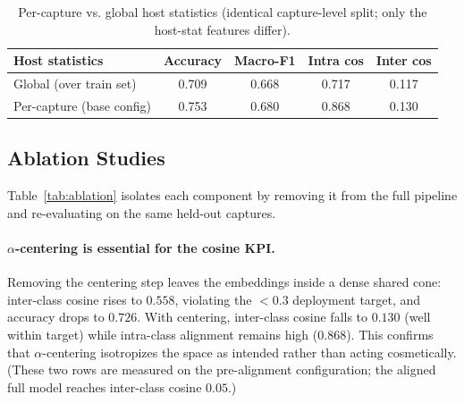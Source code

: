 \documentclass{article}
\begin{document}
\begin{table}[h]
  \caption{Per-capture vs. global host statistics (identical capture-level split; only the host-stat features differ).}
  \label{tab:hoststats}
  \centering
  \begin{tabular}{lcccc}
    \toprule
    Host statistics & Accuracy & Macro-F1 & Intra cos & Inter cos \\
    \midrule
    Global (over train set)      & 0.709 & 0.668 & 0.717 & 0.117 \\
    Per-capture (base config)    & 0.753 & 0.680 & 0.868 & 0.130 \\
    \bottomrule
  \end{tabular}
\end{table}

\subsection{Ablation Studies}
\label{sec:ablation}

Table~\ref{tab:ablation} isolates each component by removing it from the full pipeline and re-evaluating on the same held-out captures.

\paragraph{$\alpha$-centering is essential for the cosine KPI.} Removing the centering step leaves the embeddings inside a dense shared cone: inter-class cosine rises to $0.558$, violating the $<0.3$ deployment target, and accuracy drops to $0.726$. With centering, inter-class cosine falls to $0.130$ (well within target) while intra-class alignment remains high ($0.868$). This confirms that $\alpha$-centering isotropizes the space as intended rather than acting cosmetically. (These two rows are measured on the pre-alignment configuration; the aligned full model reaches inter-class cosine $0.05$.)
\end{document}
